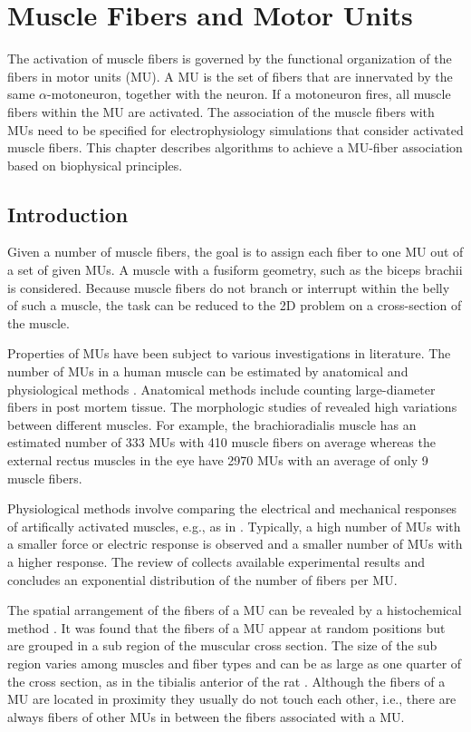 
\chapter{Muscle Fibers and Motor Units} 
The activation of muscle fibers is governed by the functional organization of the fibers in motor units (MU). A MU is the set of fibers that are innervated by the same $\alpha$-motoneuron, together with the neuron. If a motoneuron fires, all muscle fibers within the MU are activated. The association of the muscle fibers with MUs need to be specified for electrophysiology simulations that consider activated muscle fibers. This chapter describes algorithms to achieve a MU-fiber association based on biophysical principles.

\section{Introduction}\label{sec:mu_intro}
Given a number of muscle fibers, the goal is to assign each fiber to one MU out of a set of given MUs. A muscle with a fusiform geometry, such as the biceps brachii is considered. Because muscle fibers do not branch or interrupt within the belly of such a muscle, the task can be reduced to the 2D problem on a cross-section of the muscle.

Properties of MUs have been subject to various investigations in literature. The number of MUs in a human muscle can be estimated by anatomical and physiological methods \cite{MacIntosh2006}. Anatomical methods include counting large-diameter fibers in post mortem tissue. The morphologic studies of \cite{Feinstein1955} revealed high variations between different muscles. For example, the brachioradialis muscle has an estimated number of \num{333} MUs with \num{410} muscle fibers on average whereas the external rectus muscles in the eye have \num{2970} MUs with an average of only 9 muscle fibers. 

Physiological methods involve comparing the electrical and mechanical responses of artifically activated muscles, e.g., as in \cite{Milner-Brown1973b,Thomas1990b}. Typically, a high number of MUs with a smaller force or electric response is observed and a smaller number of MUs with a higher response. 
The review of \cite{Enoka2001} collects available experimental results and concludes an exponential distribution of the number of fibers per MU.

The spatial arrangement of the fibers of a MU can be revealed by a histochemical method \cite{brandstater1969histochemical}. It was found that the fibers of a MU appear at random positions but are grouped in a sub region of the muscular cross section. The size of the sub region varies among muscles and fiber types and can be as large as one quarter of the cross section, as in the tibialis anterior of the rat \cite{Edstrom1968}. Although the fibers of a MU are located in proximity they usually do not touch each other, i.e., there are always fibers of other MUs in between the fibers associated with a MU.

